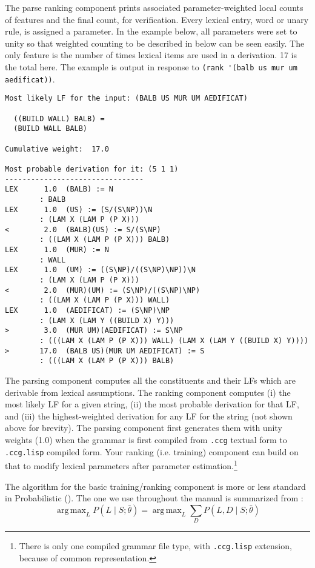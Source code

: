 \documentclass[11pt]{article}
\DeclareMathOperator*{\argmax}{arg\,max}
\begin{document}
\noindent The parse ranking component prints associated parameter-weighted local counts of features and the final count, for verification. Every lexical entry, word or unary rule, is assigned a parameter.
In the example below, all parameters were set to unity so that weighted counting to be described in below can be seen easily. The only feature is the number of times lexical items are used in a derivation. 17 is the total here.
The example is output in response to \verb+(rank '(balb us mur um aedificat))+.

{\scriptsize
\begin{verbatim}
Most likely LF for the input: (BALB US MUR UM AEDIFICAT)

  ((BUILD WALL) BALB) =
  (BUILD WALL BALB)

Cumulative weight:  17.0

Most probable derivation for it: (5 1 1)
--------------------------------
LEX      1.0  (BALB) := N
        : BALB
LEX      1.0  (US) := (S/(S\NP))\N
        : (LAM X (LAM P (P X)))
<        2.0  (BALB)(US) := S/(S\NP)
        : ((LAM X (LAM P (P X))) BALB)
LEX      1.0  (MUR) := N
        : WALL
LEX      1.0  (UM) := ((S\NP)/((S\NP)\NP))\N
        : (LAM X (LAM P (P X)))
<        2.0  (MUR)(UM) := (S\NP)/((S\NP)\NP)
        : ((LAM X (LAM P (P X))) WALL)
LEX      1.0  (AEDIFICAT) := (S\NP)\NP
        : (LAM X (LAM Y ((BUILD X) Y)))
>        3.0  (MUR UM)(AEDIFICAT) := S\NP
        : (((LAM X (LAM P (P X))) WALL) (LAM X (LAM Y ((BUILD X) Y))))
>       17.0  (BALB US)(MUR UM AEDIFICAT) := S
        : (((LAM X (LAM P (P X))) BALB)
\end{verbatim}}


\noindent The parsing component computes all the constituents and their LFs which are derivable from lexical assumptions.
The ranking component computes (i) the most likely LF for a given string, (ii) the most probable derivation for that LF,
and (iii) the highest-weighted derivation for any LF for the string (not shown above for brevity).  The parsing component first generates them with unity weights (1.0) when the grammar is first compiled from \verb+.ccg+ textual form to \verb+.ccg.lisp+ compiled form. 
Your ranking (i.e. training) component can build on that to modify  lexical parameters after parameter estimation.\footnote{There is only one compiled grammar file type, with \verb+.ccg.lisp+ extension, because of common representation.} 

The algorithm for the basic training/ranking component is more or less standard  in Probabilistic  (). The one we
use  throughout the manual is summarized from \cite{zettlemoyercollins05}:
\begin{equation}
\label{rul:argmax}
\argmax_L P(L\mid S;\bar{\theta}) = \argmax_L \sum_D P(L, D\mid S;\bar{\theta})
\end{equation}
\end{document}
